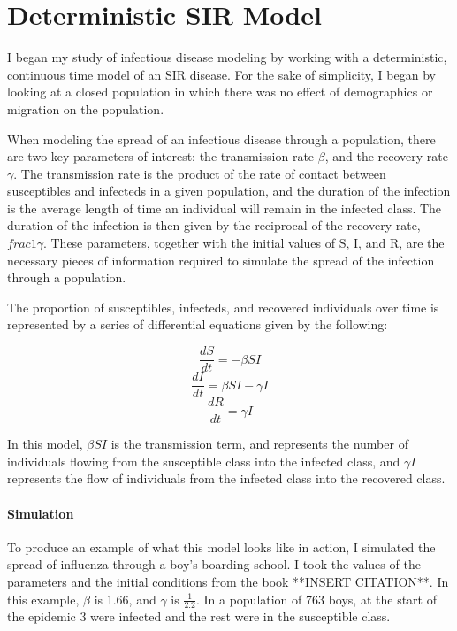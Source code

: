 \documentclass{article}
\begin{document}
\section{Deterministic SIR Model}
I began my study of infectious disease modeling by working with a deterministic, continuous time model of an SIR disease. For the sake of simplicity, I began by looking at a closed population in which there was no effect of demographics or migration on the population. 

When modeling the spread of an infectious disease through a population, there are two key parameters of interest: the transmission rate $\beta$, and the recovery rate $\gamma$. The transmission rate is the product of the rate of contact between susceptibles and infecteds in a given population, and the duration of the infection is the average length of time an individual will remain in the infected class. The duration of the infection is then given by the reciprocal of the recovery rate, $frac{1}{\gamma}$. These parameters, together with the initial values of S, I, and R, are the necessary pieces of information required to simulate the spread of the infection through a population. 

The proportion of susceptibles, infecteds, and recovered individuals over time is represented by a series of differential equations given by the following:

\begin{equation}\frac{dS}{dt} = -\beta SI \end{equation}
\begin{equation}\frac{dI}{dt} = \beta SI - \gamma I \end{equation}
\begin{equation}\frac{dR}{dt} = \gamma I \end{equation}

In this model, $\beta SI$ is the transmission term, and represents the number of individuals flowing from the susceptible class into the infected class, and $\gamma I$ represents the flow of individuals from the infected class into the recovered class. 

\paragraph{Simulation}
To produce an example of what this model looks like in action, I simulated the spread of influenza through a boy's boarding school. I took the values of the parameters and the initial conditions from the book **INSERT CITATION**. In this example, $\beta$ is 1.66, and $\gamma$ is $\frac{1}{2.2}$. In a population of 763 boys, at the start of the epidemic 3 were infected and the rest were in the susceptible class. 
\end{document}
